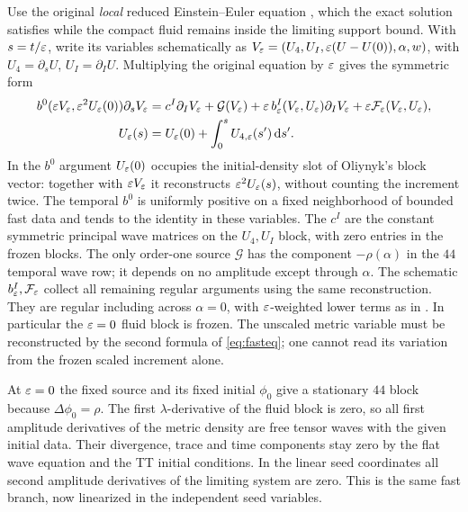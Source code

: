 Use the original \emph{local} reduced Einstein--Euler equation \cite[Eq.~(64)]{Oliynyk}, which the exact solution satisfies while the compact fluid remains inside the limiting support bound. With \(s=t/\varepsilon\), write its variables schematically as
\(V_\varepsilon=(U_4,U_I,\varepsilon(U-U(0)),\alpha,w)\), with \(U_4=\partial_s U\), \(U_I=\partial_I U\). Multiplying the original equation by \(\varepsilon\) gives the symmetric form
\begin{equation}
\begin{aligned}
 b^0(\varepsilon V_\varepsilon,\varepsilon^2U_\varepsilon(0))\partial_s V_\varepsilon
 &=c^I\partial_I V_\varepsilon+\mathcal G(V_\varepsilon)
     +\varepsilon\,b^I_\varepsilon(V_\varepsilon,U_\varepsilon)\partial_I V_\varepsilon
     +\varepsilon\mathcal F_\varepsilon(V_\varepsilon,U_\varepsilon),\\
 U_\varepsilon(s)&=U_\varepsilon(0)+\int_0^s U_{4,\varepsilon}(s')\,\mathrm d s' .
\end{aligned}
 \label{eq:fasteq}
\end{equation}
In the \(b^0\) argument \(U_\varepsilon(0)\) occupies the initial-density slot of Oliynyk's block vector: together with \(\varepsilon V_\varepsilon\) it reconstructs \(\varepsilon^2U_\varepsilon(s)\), without counting the increment twice. The temporal \(b^0\) is uniformly positive on a fixed neighborhood of bounded fast data and tends to the identity in these variables. The \(c^I\) are the constant symmetric principal wave matrices on the \(U_4,U_I\) block, with zero entries in the frozen blocks. The only order-one source \(\mathcal G\) has the component \(-\rho(\alpha)\) in the \(44\) temporal wave row; it depends on no amplitude except through \(\alpha\). The schematic \(b^I_\varepsilon,\mathcal F_\varepsilon\) collect all remaining regular arguments using the same reconstruction. They are regular including across \(\alpha=0\), with \(\varepsilon\)-weighted lower terms as in \cite[Eqs.~(65)--(72)]{Oliynyk}. In particular the \(\varepsilon=0\) fluid block is frozen. The unscaled metric variable must be reconstructed by the second formula of \eqref{eq:fasteq}; one cannot read its variation from the frozen scaled increment alone.

At \(\varepsilon=0\) the fixed source and its fixed initial \(\phi_0\) give a stationary \(44\) block because \(\Delta\phi_0=\rho\). The first \(\lambda\)-derivative of the fluid block is zero, so all first amplitude derivatives of the metric density are free tensor waves with the given initial data. Their divergence, trace and time components stay zero by the flat wave equation and the TT initial conditions. In the linear seed coordinates all second amplitude derivatives of the limiting system are zero. This is the same fast branch, now linearized in the independent seed variables.

